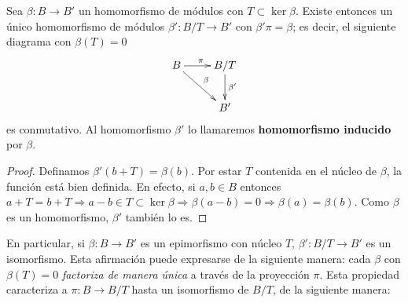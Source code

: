 \begin{proposicion}
	\label{prop:teo-fact}
Sea \( \beta: B \rightarrow B' \) un homomorfismo de módulos con \( T \subset \ker \beta \). Existe entonces un único homomorfismo de módulos \( \beta': B/T \rightarrow B' \) con \( \beta'\pi = \beta \); es decir, el siguiente diagrama con \( \beta(T) = 0 \)
\begin{equation}
    \label{firstisothm}
    \xymatrix{
        B \ar[r]^\pi \ar[dr]^\beta & B/T \ar[d]^{\beta'} \\
        & B'
    }
\end{equation}
es conmutativo. Al homomorfismo $\beta'$ lo llamaremos \textbf{homomorfismo inducido} por $\beta$.
\end{proposicion}
\begin{proof}
Definamos \( \beta'(b + T) = \beta(b) \). Por estar $T$ contenida en el núcleo de $\beta$, la función está bien definida. En efecto, si $a,b \in B$ entonces $a+T = b+T \Rightarrow a-b \in T \subset \ker \beta \Rightarrow \beta(a-b) = 0 \Rightarrow \beta(a)=\beta(b)$. Como $\beta$ es un homomorfismo, $\beta'$ también lo es.
\end{proof}
En particular, si \( \beta: B \rightarrow B' \) es un epimorfismo con núcleo \( T \), \( \beta': B/T \rightarrow B' \) es un isomorfismo. Esta afirmación puede expresarse de la siguiente manera: cada \( \beta \) con \( \beta(T) = 0 \) \textit{factoriza de manera única} a través de la proyección \( \pi \). Esta propiedad caracteriza a \( \pi: B \rightarrow B/T \) hasta un isomorfismo de \( B/T \), de la siguiente manera:
%
%

